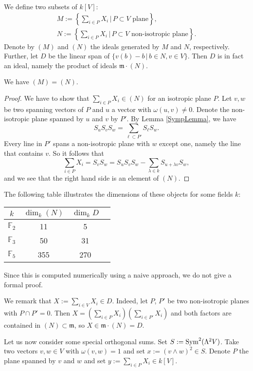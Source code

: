 \begin{definition} \label{SymplecticIdeal}
We define two subsets of $k[V]$:
\begin{gather*}
M := \left\{\sum_{i\in P}X_i \,|\, P\subset V \text{ plane}\right\}, \\
N  := \left\{\sum_{i\in P}X_i \,|\, P\subset V \text{ non-isotropic plane}\right\}.
\end{gather*}
Denote by $(M)$ and $(N)$ the ideals generated by $M$ and $N$, respectively. 
Further, let $D$ be the linear span of $\{v(b) - b \,|\, b\in N, v\in V \}$. Then $D$ is in fact an ideal, namely the product of ideals $\mathfrak m\cdot (N)$.
\end{definition}
\begin{proposition}
We have $(M)=(N)$.
\end{proposition}
\begin{proof}
We have to show that $\sum_{i\in P}X_i \in (N)$ for an isotropic plane $P$. Let $v,w$ be two spanning vectors of $P$ and $u$ a vector with $\omega(u,v)\neq 0$. Denote the non-isotropic plane spanned by $u $ and $v$ by $P'$. By Lemma \ref{SympLemma}, we have
$$
S_uS_vS_w = \sum_{\ell\subset P'} S_{\ell}S_w.
$$
Every line in $P'$ spans a non-isotropic plane with $w$ except one, namely the line that contains $v$. So it follows that
$$
\sum_{i\in P}X_i = S_vS_w = S_uS_vS_w  - \sum_{\lambda\in k} S_{u + \lambda v}S_w, 
$$
and we see that the right hand side is an element of $(N)$.
\end{proof}

\begin{proposition} \label{SymplecticIdealsDimension}
The following table illustrates the dimensions of these objects for some fields $k$:
\vspace{2mm}
\begin{center}
\begin{tabular}{c||c|c|c}
 $k$ & $\dim_k(N)$ & $\dim_k D$ \\
\hline
$\mathbb F_2$   & 11 &  5  \\
$\mathbb F_3$  & 50 & 31  \\
$\mathbb F_5$  &355 &270
\end{tabular}
\end{center}
\end{proposition}
Since this is computed numerically using a naive approach, we do not give a formal proof.
\begin{rmk}\label{c2}
We remark that $X:=\sum_{i\in V}X_i\in D$. Indeed, let $P$, $P'$ be two non-isotropic planes with $P \cap P' = 0$. Then $X = \left( \sum_{i\in P}X_i\right)\left(  \sum_{i\in P'}X_i \right)$ and both factors are contained in $(N)\subset \mathfrak m$, so $X\in \mathfrak m \cdot (N) = D$.
\end{rmk}
Let us now consider some special orthogonal sums.
Set $S:=\operatorname{Sym}^2 (\Lambda^2V)$. Take two vectors $v,w\in V$ with $\omega(v,w)=1$ and set $x:= (v\wedge w)^2\in S$. Denote $P$ the plane spanned by $v$ and $w$ and set $y:= \sum_{i\in P}X_i\in  k[V]$.

